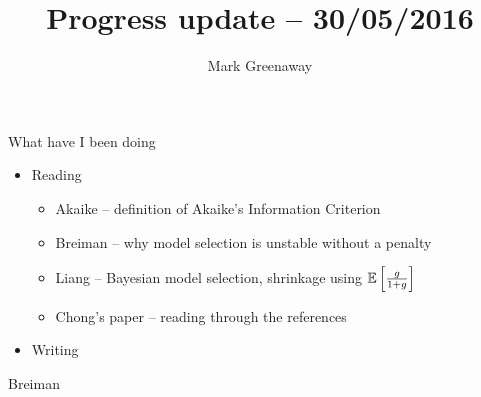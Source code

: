 \documentclass{beamer}
\title{Progress update -- 30/05/2016}
\author{Mark Greenaway}
\begin{document}
\begin{frame}
\titlepage
\end{frame}

\begin{frame}{What have I been doing}
\begin{itemize}
\item Reading
	\begin{itemize}
		\item Akaike -- definition of Akaike's Information Criterion
		\item Breiman -- why model selection is unstable without a penalty
		\item Liang -- Bayesian model selection, shrinkage using $\mathbb{E} \left[\frac{g}{1 + g}\right]$
		\item Chong's paper -- reading through the references
	\end{itemize}
\item Writing
	\begin{itemize}
	
	\end{itemize}
\end{itemize}
\end{frame}

\begin{frame}{Breiman}
\end{frame}
\end{document}

